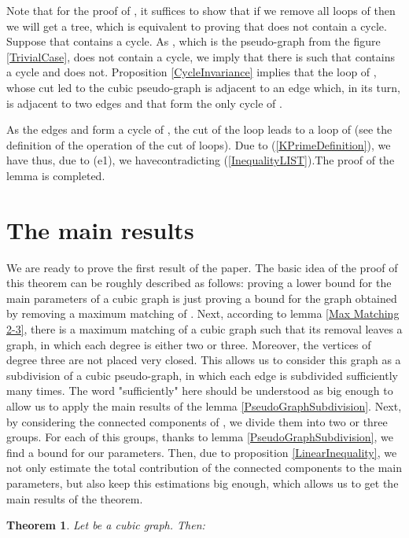 \documentclass[fleqn,12pt,twoside]{article}
\newtheorem{theorem}{Theorem}
\newenvironment{proof}[1][Proof.]{\begin{trivlist}
\item[\hskip \labelsep {\bfseries #1}]}{\end{trivlist}}
\begin{document}
\begin{proof}
Note that for the proof of , it suffices to show
that if we remove all loops of  then we will get a tree,
which is equivalent to proving that  does not contain a
cycle. Suppose that  contains a cycle. As ,
which is the pseudo-graph from the
figure \ref{TrivialCase}, does not contain a cycle, we imply that there is  such that  contains a cycle and  does not. Proposition \ref{CycleInvariance} implies
that the
loop  of , whose cut led to the cubic pseudo-graph  is adjacent to an edge  which, in its turn, is
adjacent to two edges  and  that form the
only cycle of .

As the edges  and  form a cycle of
,
the cut of the loop  leads to a loop  of  (see the definition of the operation of the cut of
loops). Due to (\ref{KPrimeDefinition}), we have
thus, due to (e1), we havecontradicting (\ref{InequalityLIST}).The proof of the lemma is
completed.
\end{proof}

\section{The main results}

We are ready to prove the first result of the paper. The basic idea
of the proof of this theorem can be roughly described as follows:
proving a lower bound for the main parameters of a cubic graph 
is just proving a bound for the graph  obtained by
removing a maximum matching  of . Next, according to lemma
\ref{Max Matching 2-3}, there is a maximum matching of a cubic graph
such that its removal leaves a graph, in which each degree is either
two or three. Moreover, the vertices of degree three are not placed
very closed. This allows us to consider this graph as a subdivision
of a cubic pseudo-graph, in which each edge is subdivided
sufficiently many times. The word "sufficiently" here should be
understood as big enough to allow us to apply the main results of
the lemma \ref{PseudoGraphSubdivision}. Next, by considering the
connected components of , we divide them into two or
three groups. For each of this groups, thanks to lemma
\ref{PseudoGraphSubdivision}, we find a bound for our parameters.
Then, due to proposition \ref{LinearInequality}, we not only
estimate the total contribution of the connected components to the
main parameters, but also keep this estimations big enough, which
allows us to get the main results of the theorem.

\begin{theorem}
\label{MainTheoremCubics}Let  be a cubic graph. Then:
\end{theorem}
\end{document}
